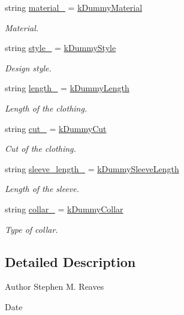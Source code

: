 \begin{DoxyCompactItemize}
string \mbox{\hyperlink{classClothes_adbb9ed311f14ccbb1e4fe0e8378a95d4}{material\+\_\+}} = \mbox{\hyperlink{clothes_8h_a9df1268c6668ae4e2a728ccf032cc33d}{k\+Dummy\+Material}}
\begin{DoxyCompactList}\small\item\em Material. \end{DoxyCompactList}\item 
string \mbox{\hyperlink{classClothes_aa85ed2b95110d8c477a1aca9cb403f98}{style\+\_\+}} = \mbox{\hyperlink{clothes_8h_a9deec6ed1f40928bfa0040eeab95ed6b}{k\+Dummy\+Style}}
\begin{DoxyCompactList}\small\item\em Design style. \end{DoxyCompactList}\item 
string \mbox{\hyperlink{classClothes_ae02603eda727e33caf46ec30e761e3c3}{length\+\_\+}} = \mbox{\hyperlink{clothes_8h_a1624256dcecfb0995a74c36142593770}{k\+Dummy\+Length}}
\begin{DoxyCompactList}\small\item\em Length of the clothing. \end{DoxyCompactList}\item 
string \mbox{\hyperlink{classClothes_ac1c2286c8928a5eee91d818a098a44ac}{cut\+\_\+}} = \mbox{\hyperlink{clothes_8h_a8a6eb066049b009439505355aeaae375}{k\+Dummy\+Cut}}
\begin{DoxyCompactList}\small\item\em Cut of the clothing. \end{DoxyCompactList}\item 
string \mbox{\hyperlink{classClothes_a012aeb71e62ebaf9b5b5dd700cc8d5db}{sleeve\+\_\+length\+\_\+}} = \mbox{\hyperlink{clothes_8h_a0f53dde6a2c4c344bb7da50655497350}{k\+Dummy\+Sleeve\+Length}}
\begin{DoxyCompactList}\small\item\em Length of the sleeve. \end{DoxyCompactList}\item 
string \mbox{\hyperlink{classClothes_ae2e5026257b3a2f2ddbf61757fd3b57b}{collar\+\_\+}} = \mbox{\hyperlink{clothes_8h_ac06c9f556f68bcd2829e36c55b70a86e}{k\+Dummy\+Collar}}
\begin{DoxyCompactList}\small\item\em Type of collar. \end{DoxyCompactList}\end{DoxyCompactItemize}


\subsection{Detailed Description}
\begin{DoxyAuthor}{Author}
Stephen M. Reaves 
\end{DoxyAuthor}
\begin{DoxyDate}{Date}

\end{DoxyDate}



